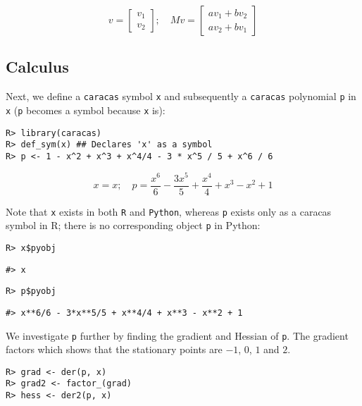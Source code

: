 \[
v = \left[\begin{matrix}v_{1}\\v_{2}\end{matrix}\right]; \quad  Mv = \left[\begin{matrix}a v_{1} + b v_{2}\\a v_{2} + b v_{1}\end{matrix}\right]
\]

\hypertarget{calculus}{%
\subsection{Calculus}\label{calculus}}

Next, we define a \texttt{caracas} symbol \texttt{x} and
subsequently a \texttt{caracas} polynomial \texttt{p} in \texttt{x} (\texttt{p} becomes a symbol because \texttt{x} is):

\begin{verbatim}
R> library(caracas)
R> def_sym(x) ## Declares 'x' as a symbol
R> p <- 1 - x^2 + x^3 + x^4/4 - 3 * x^5 / 5 + x^6 / 6
\end{verbatim}

\[
x = x; \quad p = \frac{x^{6}}{6} - \frac{3 x^{5}}{5} + \frac{x^{4}}{4} + x^{3} - x^{2} + 1
\]

Note that \texttt{x} exists in both \texttt{R} and \texttt{Python}, whereas \texttt{p}
exists only as a caracas symbol in R; there is no corresponding object
\texttt{p} in Python:

\begin{verbatim}
R> x$pyobj
\end{verbatim}

\begin{verbatim}
#> x
\end{verbatim}

\begin{verbatim}
R> p$pyobj
\end{verbatim}

\begin{verbatim}
#> x**6/6 - 3*x**5/5 + x**4/4 + x**3 - x**2 + 1
\end{verbatim}

We investigate \texttt{p} further by finding the gradient and Hessian of \texttt{p}. The gradient factors which shows that the stationary
points are \(-1\), \(0\), \(1\) and \(2\).

\begin{verbatim}
R> grad <- der(p, x) 
R> grad2 <- factor_(grad)
R> hess <- der2(p, x)
\end{verbatim}

